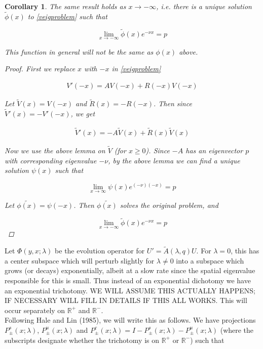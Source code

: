 \documentclass[12pt]{article}
\def\R{{\mathbb R}}
\newtheorem{corollary}{Corollary}
\begin{document}
\begin{corollary}The same result holds as $x \rightarrow -\infty$, i.e. there is a unique solution $\tilde{\phi}(x)$ to \eqref{veigproblem} such that 

\[
\lim_{x\rightarrow -\infty} \tilde{\phi}(x) e^{-\nu x} = p
\]

This function in general will not be the same as $\phi(x)$ above.

\begin{proof}
First we replace $x$ with $-x$ in \eqref{veigproblem}

\begin{align*}
V'(-x) = A V(-x) + R(-x)V(-x)
\end{align*}

Let $\tilde{V}(x) = V(-x)$ and $\tilde{R}(x) = -R(-x)$. Then since $\tilde{V}'(x) = -V'(-x)$, we get

\begin{align*}
\tilde{V}'(x) = -A \tilde{V}(x) + \tilde{R}(x)\tilde{V}(x)
\end{align*}

Now we use the above lemma on $\tilde{V}$ (for $x \geq 0$). Since $-A$ has an eigenvector $p$ with corresponding eigenvalue $-\nu$, by the above lemma we can find a unique solution $\psi(x)$ such that 

\[
\lim_{x\rightarrow \infty} \psi(x) e^{(-\nu)(-x)} = p
\]

Let $\tilde{\phi(x)} = \psi(-x)$. Then $\tilde{\phi(x)}$ solves the original problem, and

\[
\lim_{x\rightarrow -\infty} \tilde{\phi}(x) e^{-\nu x } = p
\]


\end{proof}
\end{corollary}


Let $\Phi(y,x; \lambda)$ be the evolution operator for $U' = \tilde{A}(\lambda, q) U$. For $\lambda = 0$, this has a center subspace which will perturb slightly for $\lambda \neq 0$ into a subspace which grows (or decays) exponentially, albeit at a slow rate since the spatial eigenvalue responsible for this is small. Thus instead of an exponential dichotomy we have an exponential trichotomy. WE WILL ASSUME THIS ACTUALLY HAPPENS; IF NECESSARY WILL FILL IN DETAILS IF THIS ALL WORKS. This will occur separately on $\R^+$ and $\R^-$.\\

Following Hale and Lin (1985), we will write this as follows. We have projections $P^s_\pm(x; \lambda)$, $P^u_\pm(x; \lambda)$ and $P^c_\pm(x; \lambda) = I - P^s_\pm(x; \lambda) - P^u_\pm(x; \lambda)$ (where the subscripts designate whether the trichotomy is on $\R^+$ or $\R^-$) such that
\end{document}
